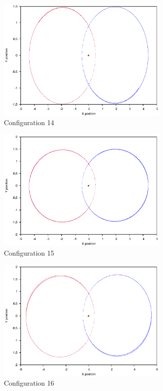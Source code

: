 \documentclass[a4paper,12pt]{article}
\begin{document}
\begin{figure}[H]
\centering
\includegraphics[width=0.75\textwidth]{./results/05-9-05-1/Orbit.eps}
\caption{Configuration 14}
\label{fig:config14}
\end{figure}
\begin{figure}[H]
\centering
\includegraphics[width=0.75\textwidth]{./results/05-9-05-15/Orbit.eps}
\caption{Configuration 15}
\label{fig:config15}
\end{figure}
\begin{figure}[H]
\centering
\includegraphics[width=0.75\textwidth]{./results/06-95-06-15/Orbit.eps}
\caption{Configuration 16}
\label{fig:config16}
\end{figure}
\end{document}
